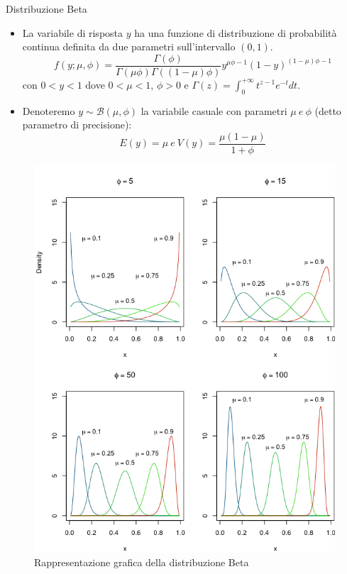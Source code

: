 \documentclass[usenames,dvipsnames]{beamer}
\begin{document}
\begin{frame}{Distribuzione Beta}
\begin{itemize}
\item[]La variabile di risposta $y$ ha una funzione di distribuzione di probabilità continua definita da due parametri sull'intervallo $(0,1)$. 
$$f(y;\mu, \phi )=\frac{\Gamma (\phi )}{\Gamma (\mu \phi )\Gamma ((1-\mu )\phi )}y^{\mu \phi -1}(1-y)^{(1-\mu)\phi-1}$$
con $0<y<1$ dove $0<\mu<1$, $\phi>0$ e $\Gamma(z)=\int_{0}^{+\infty}t^{z-1}e^{-t}dt.$
\item[]Denoteremo $y \sim \mathcal{B}(\mu,\phi)$ la variabile casuale con parametri $\mu \ e \ \phi$ (detto parametro di precisione): $$E(y)=\mu \ e \ V(y)=\frac{\mu (1-\mu )}{1+\phi}$$
\end{itemize}
\end{frame}

\begin{frame}
\vspace{1.5cm}
\begin{figure}[ht]
\centering
\includegraphics[scale=.22]{BetaDistribution}
\caption{Rappresentazione grafica della distribuzione Beta}
\end{figure}


\end{frame}
\end{document}

